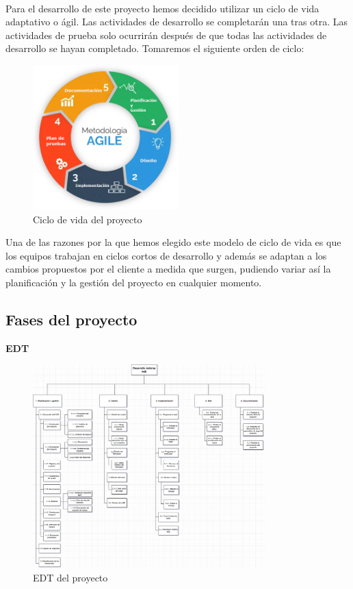 \documentclass{report}
\begin{document}
                \paragraph*{}
                Para el desarrollo de este proyecto hemos decidido utilizar un ciclo de vida adaptativo o ágil. Las actividades de desarrollo se completarán una tras otra. Las actividades de prueba solo ocurrirán después de que todas las actividades de desarrollo se hayan completado.  Tomaremos el siguiente orden de ciclo:
                \begin{figure}[H]
                    \centering
                    \includegraphics[width=0.5\textwidth]{./img/ciclo_vida.png}
                    \caption{Ciclo de vida del proyecto}
                \end{figure}
                Una de las razones por la que hemos elegido este modelo de ciclo de vida es que los equipos trabajan en ciclos cortos de desarrollo y además se adaptan a los cambios propuestos por el cliente a medida que surgen, pudiendo variar así la planificación y la gestión del proyecto en cualquier momento.
            \clearpage
            \subsection{Fases del proyecto}
                \textbf{EDT}
                \begin{figure}[H]
                    \centering
                    \includegraphics[width=0.8\textwidth]{./img/edt.png}
                    \caption{EDT del proyecto}
                \end{figure}
            \clearpage
\end{document}
